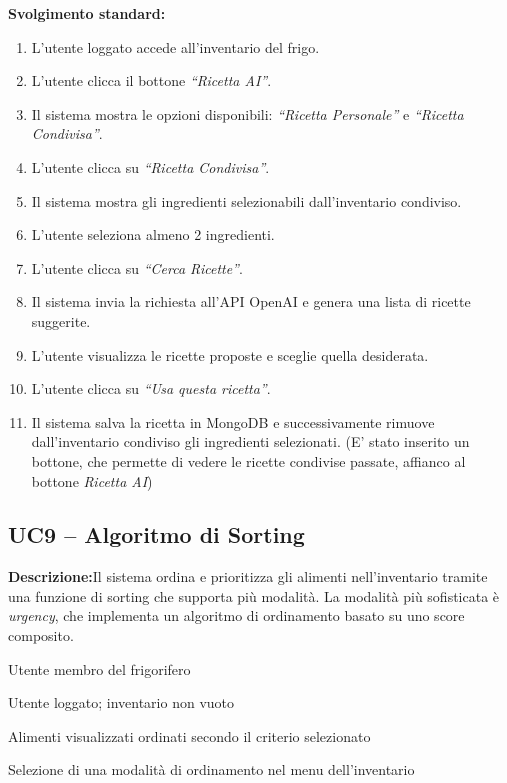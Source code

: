 \documentclass[12pt,a4paper,twoside]{report}
\newenvironment{ucbox}{%
  \begin{mdframed}[
    backgroundcolor=ucbg,
    linecolor=ucborder,
    linewidth=1pt,
    innerleftmargin=10pt,
    innerrightmargin=10pt,
    innertopmargin=8pt,
    innerbottommargin=8pt,
    roundcorner=4pt
  ]
}{%
  \end{mdframed}
}
\begin{document}
\textbf{Svolgimento standard:}
\begin{enumerate}
  \item L'utente loggato accede all'inventario del frigo.
  \item L'utente clicca il bottone \textit{``Ricetta AI''}.
  \item Il sistema mostra le opzioni disponibili: \textit{``Ricetta Personale''} e \textit{``Ricetta Condivisa''}.
  \item L'utente clicca su \textit{``Ricetta Condivisa''}.
  \item Il sistema mostra gli ingredienti selezionabili dall'inventario condiviso.
  \item L'utente seleziona almeno 2 ingredienti.
  \item L'utente clicca su \textit{``Cerca Ricette''}.
  \item Il sistema invia la richiesta all'API OpenAI e genera una lista di ricette suggerite.
  \item L'utente visualizza le ricette proposte e sceglie quella desiderata.
  \item L'utente clicca su \textit{``Usa questa ricetta''}.
  \item Il sistema salva la ricetta in MongoDB e successivamente rimuove dall'inventario condiviso gli ingredienti selezionati. (E' stato inserito un bottone, che permette di vedere le ricette condivise passate, affianco al bottone \textit{Ricetta AI})
\end{enumerate}

\subsection{UC9 -- Algoritmo di Sorting}

\begin{ucbox}
\textbf{Descrizione:}Il sistema ordina e prioritizza gli alimenti nell'inventario tramite una funzione di sorting che supporta più modalità. La modalità più sofisticata è \textit{urgency}, che implementa un algoritmo di ordinamento basato su uno score composito.

\begin{description}[leftmargin=4cm, style=sameline]
  \item[Attori Coinvolti:] Utente membro del frigorifero
  \item[Precondizione:] Utente loggato; inventario non vuoto
  \item[Postcondizione:] Alimenti visualizzati ordinati secondo il criterio selezionato
  \item[Trigger:] Selezione di una modalità di ordinamento nel menu dell'inventario
\end{description}
\end{ucbox}
\end{document}
